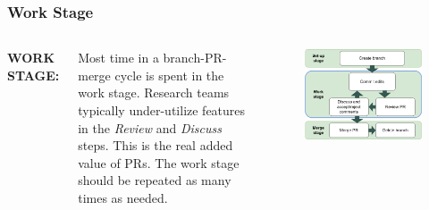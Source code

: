 \documentclass[aspectratio=169]{beamer}
\begin{document}
\begin{frame}
	\frametitle{Work Stage}
	\begin{columns}[c]
		
		
		\Large \textbf{WORK STAGE:}
		\vspace{.8em}
		
		\normalsize
		Most time in a branch-PR-merge cycle is spent in the work stage.
		\vspace{.5cm}\newline
		Research teams typically under-utilize features 
		in the \textit{Review} and \textit{Discuss} steps. 
		This is the real added value of PRs.\vspace{.5cm}\newline
		The work stage should be repeated as many times as needed.
		
		\vspace{-.75cm}
		\begin{figure}
			\centering
			\includegraphics[width=\textwidth]{./img/branch-pr-merge-cycle-S2.png}
		\end{figure}
		
	\end{columns}
\end{frame}
\end{document}
